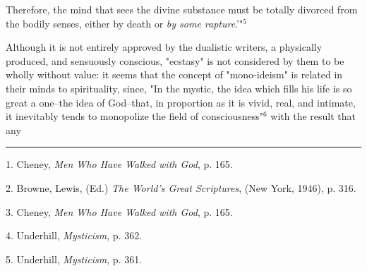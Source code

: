 Therefore, the mind that sees the divine substance must be
totally divorced from the bodily senses, either by death or
\textit{by some rapture}.'"$^{5}$\par
\vspace*{0.5\baselineskip}
Although it is not entirely approved by the dualistic
writers, a physically produced, and sensuously conscious,
"ecstasy" is not considered by them to be wholly without
value: it seems that the concept of "mono-ideism" is related
in their minds to spirituality, since, "In the mystic, the
idea which fills his life is so great a one--the idea of God--that,
in proportion as it is vivid, real, and intimate, it
inevitably tends to monopolize the field of consciousness"$^{6}$
with the result that any\linebreak
\null\par
\vspace*{-\baselineskip}
\vspace*{\fill}
\noindent\rule{0.25\textwidth}{0.4pt}\par
1. Cheney, \textit{Men Who Have Walked with God}, p. 165.\par
2. Browne, Lewis, (Ed.) \textit{The World's Great Scriptures}, (New York, 1946), p. 316.\par
3. Cheney, \textit{Men Who Have Walked with God}, p. 165.\par
4. Underhill, \textit{Mysticism}, p. 362.\par
5. Underhill, \textit{Mysticism}, p. 361.\par

\newpage

